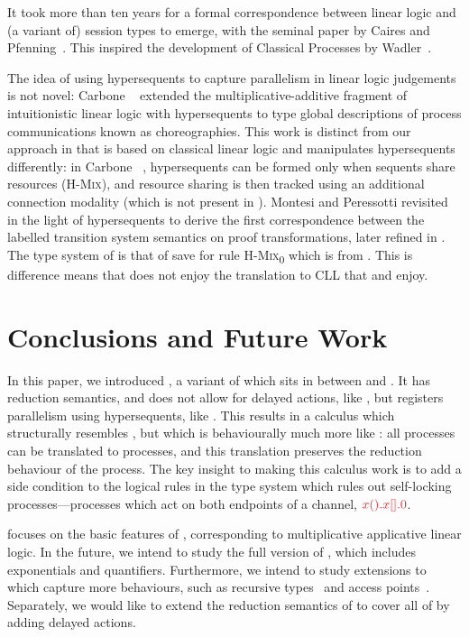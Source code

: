 \documentclass[copyright,creativecommons]{eptcs}
\begin{document}
It took more than ten years for a formal correspondence between linear logic and (a variant of) session types to emerge, with the seminal paper by Caires and Pfenning~\cite{caires2010}. This inspired the development of Classical Processes by Wadler~\cite{wadler2012}.

The idea of using hypersequents to capture parallelism in linear logic judgements is not novel: Carbone \etal~\cite{carbone2018} extended the multiplicative-additive fragment of intuitionistic linear logic with hypersequents to type global descriptions of process communications known as choreographies. This work is distinct from our approach in that \hcp is based on classical linear logic and manipulates hypersequents differently: in Carbone \etal~\cite{carbone2018}, hypersequents can be formed only when sequents share resources (\cf \textsc{H-Mix}), and resource sharing is then tracked using an additional connection modality (which is not present in \hcp).
Montesi and Peressotti \cite{montesi2018} revisited \cp in the light of hypersequents to derive the first correspondence between the labelled transition system semantics on proof transformations, later refined in \cite{kokke2019}. The type system of \hcp is that of \cite{montesi2018} save for rule \textsc{H-Mix\textsubscript{0}} which is from \cite{kokke2019}. This is difference means that \cite{montesi2018} does not enjoy the translation to CLL that \hcp and \dhcp enjoy. 

\section{Conclusions and Future Work}
\label{sec:conclusion}
In this paper, we introduced \hcp, a variant of \dhcp which sits in between \cp and \dhcp. It has reduction semantics, and does not allow for delayed actions, like \cp, but registers parallelism using hypersequents, like \dhcp. This results in a calculus which structurally resembles \dhcp, but which is behaviourally much more like \cp: all \cp processes can be translated to \hcp processes, and this translation preserves the reduction behaviour of the process. The key insight to making this calculus work is to add a side condition to the logical rules in the type system which rules out self-locking processes---processes which act on both endpoints of a channel, \eg $\tm{\piRecv{x}{}{\piBoundSend{x}{}{\piHalt}}}$.

\hcp focuses on the basic features of \cp, corresponding to multiplicative applicative linear logic. In the future, we intend to study the full version of \hcp, which includes exponentials and quantifiers. Furthermore, we intend to study extensions to \hcp which capture more behaviours, such as recursive types~\cite{lindley2016} and access points~\cite{gay2009}. Separately, we would like to extend the reduction semantics of \hcp to cover all of \dhcp by adding delayed actions.



\end{document}
